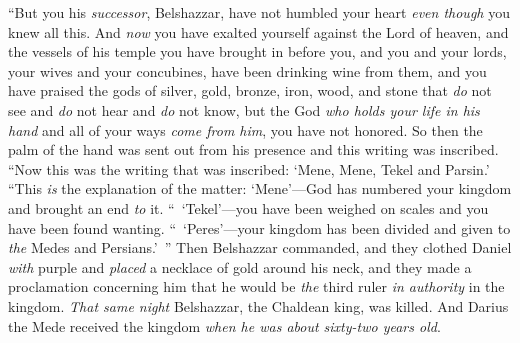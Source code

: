 \begin{biblechapter}
\verse “But you his \textit{successor}, Belshazzar, have not humbled your heart \textit{even though} you knew all this.
\verse And \textit{now} you have exalted yourself against the Lord of heaven, and the vessels of his temple you have brought in before you, and you and your lords, your wives and your concubines, have been drinking wine from them, and you have praised the gods of silver, gold, bronze, iron, wood, and stone that \textit{do} not see and \textit{do} not hear and \textit{do} not know, but the God \textit{who holds your life in his hand} and all of your ways \textit{come from him}, you have not honored.
\verse So then the palm of the hand was sent out from his presence and this writing was inscribed.
\verse “Now this was the writing that was inscribed: ‘Mene, Mene, Tekel and Parsin.’
\verse “This \textit{is} the explanation of the matter: ‘Mene’—God has numbered your kingdom and brought an end \textit{to} it.
\verse “ ‘Tekel’—you have been weighed on scales and you have been found wanting.
\verse “ ‘Peres’—your kingdom has been divided and given to \textit{the} Medes and Persians.’ ”
\verse Then Belshazzar commanded, and they clothed Daniel \textit{with} purple and \textit{placed} a necklace of gold around his neck, and they made a proclamation concerning him that he would be \textit{the} third ruler \textit{in authority} in the kingdom.
\verse \textit{That same night} Belshazzar, the Chaldean king, was killed.
\verse  And Darius the Mede received the kingdom \textit{when he was about sixty-two years old}.
\end{biblechapter}

